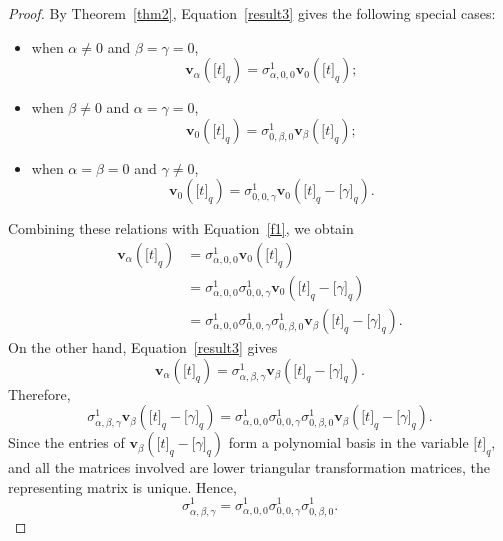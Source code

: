 \documentclass[12pt]{article}
\def\v{\mathbf{v}}
\begin{document}
\begin{proof}
	By Theorem~\ref{thm2}, Equation~\eqref{result3} gives the following special cases:
	\begin{itemize}
		\item when $\alpha\neq 0$ and $\beta=\gamma=0$,
		\begin{equation}
			\v_{\alpha}\left(\big[t\big]_q\right)
			=
			\sigma_{\alpha,0,0}^1
			\v_{0}\left(\big[t\big]_q\right);
			\label{f1}
		\end{equation}
		\item when $\beta\neq 0$ and $\alpha=\gamma=0$,
		\begin{equation*}
			\v_{0}\left(\big[t\big]_q\right)
			=
			\sigma_{0,\beta,0}^1
			\v_{\beta}\left(\big[t\big]_q\right);
		\end{equation*}
		\item when $\alpha=\beta=0$ and $\gamma\neq 0$,
		\begin{equation*}
			\v_{0}\left(\big[t\big]_q\right)
			=
			\sigma_{0,0,\gamma}^1
			\v_{0}\left(\big[t\big]_q-\big[\gamma\big]_q\right).
		\end{equation*}
	\end{itemize}
	Combining these relations with Equation~\eqref{f1}, we obtain
	\begin{align*}
		\v_{\alpha}\left(\big[t\big]_q\right)
		&=
		\sigma_{\alpha,0,0}^1
		\v_{0}\left(\big[t\big]_q\right)\\
		&=
		\sigma_{\alpha,0,0}^1
		\sigma_{0,0,\gamma}^1
		\v_{0}\left(\big[t\big]_q-\big[\gamma\big]_q\right)\\
		&=
		\sigma_{\alpha,0,0}^1
		\sigma_{0,0,\gamma}^1
		\sigma_{0,\beta,0}^1
		\v_{\beta}\left(\big[t\big]_q-\big[\gamma\big]_q\right).
	\end{align*}
	On the other hand, Equation~\eqref{result3} gives
	\begin{equation*}
		\v_{\alpha}\left(\big[t\big]_q\right)
		=
		\sigma_{\alpha,\beta,\gamma}^1
		\v_{\beta}\left(\big[t\big]_q-\big[\gamma\big]_q\right).
	\end{equation*}
	Therefore,
	\begin{equation*}
		\sigma_{\alpha,\beta,\gamma}^1
		\v_{\beta}\left(\big[t\big]_q-\big[\gamma\big]_q\right)
		=
		\sigma_{\alpha,0,0}^1
		\sigma_{0,0,\gamma}^1
		\sigma_{0,\beta,0}^1
		\v_{\beta}\left(\big[t\big]_q-\big[\gamma\big]_q\right).
	\end{equation*}
	Since the entries of
	$\v_{\beta}\left(\big[t\big]_q-\big[\gamma\big]_q\right)$
	form a polynomial basis in the variable $\big[t\big]_q$, and all the matrices involved are lower triangular transformation matrices, the representing matrix is unique. Hence,
	\begin{equation*}
		\sigma_{\alpha,\beta,\gamma}^1
		=
		\sigma_{\alpha,0,0}^1
		\sigma_{0,0,\gamma}^1
		\sigma_{0,\beta,0}^1.
	\end{equation*}
	

\end{proof}
\end{document}
